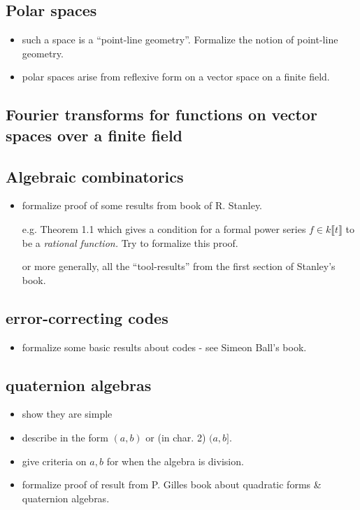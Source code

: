 \documentclass[11pt]{article}
\numberwithin{equation}{section}
\begin{document}
\subsection{Polar spaces}
\label{sec:polar-spaces}
\begin{itemize}
\item such a space is a ``point-line geometry''. Formalize the notion of
point-line geometry.

\item polar spaces arise from reflexive form on a vector space on a finite
field.
\end{itemize}
\subsection{Fourier transforms for functions on vector spaces over a finite field}
\label{sec:fourier-transforms-for-functions-on-vector-spaces-over-a-finite-field}
\subsection{Algebraic combinatorics}
\label{sec:algebraic-combinatorics}
\begin{itemize}
\item formalize proof of some results from book of R. Stanley.

e.g. Theorem 1.1 which gives a condition for a formal power series
\(f \in k\llbracket t \rrbracket\) to be a \emph{rational function.} Try
to formalize this proof.

or more generally, all the ``tool-results'' from the first section of
Stanley's book.
\end{itemize}
\subsection{error-correcting codes}
\label{sec:codes}
\begin{itemize}
\item formalize some basic results about codes - see Simeon Ball's book.
\end{itemize}
\subsection{quaternion algebras}
\label{sec:quaternion-algebras}
\begin{itemize}
\item show they are simple

\item describe in the form \((a,b)\) or (in char. 2) \((a,b]\).

\item give criteria on \(a,b\) for when the algebra is division.

\item formalize proof of result from P. Gilles book about quadratic forms
\& quaternion algebras.
\end{itemize}
\end{document}
